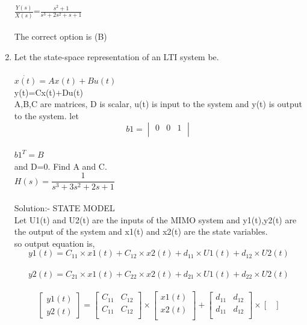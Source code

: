 \documentclass[journal,12pt,twocolumn]{IEEEtran}
\renewcommand\thesection{\arabic{section}}
\begin{document}
\begin{enumerate}[label=\arabic*.,ref=\thesection.\theenumi]
$\frac{Y(s)}{X(s)}$=$\frac{s^2+1}{s^3+2s^2+s+1}$\\
\\
 The correct option is (B)
 \\
\item
Let the state-space representation of an LTI system be.
\\
\\ $\dot{x(t)}=Ax(t)+Bu(t)$
\\y(t)=Cx(t)+Du(t)
\\A,B,C are matrices, D is scalar, u(t) is input to the system and y(t) is output to the system. let 
$$b1 =\begin{vmatrix}
 0&0&1\\
\end{vmatrix}
$$ 
\\$b1^T=B$
\\and D=0. Find A and C.
\\
$H(s)=\dfrac{1}{s^3+3s^2+2s+1}$
\\
\\{Solution:- }
STATE MODEL
\\Let U1(t) and U2(t) are the inputs of the MIMO system and y1(t),y2(t) are the output of the system and x1(t) and x2(t) are the state variables. 
\\so output equation is,
\begin{equation}
    y1(t)=C_{11}\times x1(t)+C_{12}\times x2(t)+d_{11}\times U1(t)+d_{12}\times U2(t)
\end{equation}
\\
\begin{equation}
    y2(t)=C_{21}\times x1(t)+C_{22}\times x2(t)+d_{21}\times U1(t)+d_{22}\times U2(t)
\end{equation}
\\
\[
\begin{bmatrix}
y1(t)\\
y2(t)
\end{bmatrix}
=
\begin{bmatrix}
C_{11}&C_{12}\\
C_{11}&C_{12}\\
\end{bmatrix}\times \begin{bmatrix}
x1(t)\\
x2(t)\\
\end{bmatrix}
+
\begin{bmatrix}
d_{11}&d_{12}\\
d_{11}&d_{12}\\
\end{bmatrix} \times\begin{bmatrix}

\end{bmatrix}\]
\end{enumerate}
\end{document}
